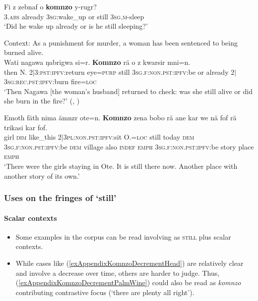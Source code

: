 \begin{exe}
	\ex\label{exAppendixKomnzo1}
	\gll Fi z zebnaf o \textbf{komnzo} y-rugr?\\
	3.\textsc{abs} already 3\textsc{sg}:wake\_up or still 3\textsc{sg.m}-sleep\\
	\glt \lq Did he wake up already or is he still sleeping?' \parencite[7]{Doehler2018}

	\ex\label{exAppendixKomnzo2}
	Context: As a punishment for murder, a woman has been sentenced to being burned alive. \\
	\gll Wati nagawa ŋabrigwa si=r. \textbf{Komnzo} rä o z kwarsir mni=n.\\
	then N. 2$|$3:\textsc{pst}:\textsc{ipfv}:return eye=\textsc{purp} still 3\textsc{sg}.\textsc{f}:\textsc{non}.\textsc{pst}:\textsc{ipfv}:be or already 2$|$3\textsc{sg}:\textsc{rec.pst}:\textsc{ipfv}:burn fire=\textsc{loc}\\
	\glt \lq Then Nagawa [the woman's husband] returned to check: was she still alive or did she burn in the fire?' (\cite[126]{Doehler2018}, \citeyear{Doehler2020})

	\ex\label{exAppendixKomnzo3} 
	\gll Emoth fäth nima ämnzr ote=n. \textbf{Komnzo} zena bobo rä ane kar we nä fof rä trikasi kar fof.\\
	girl \textsc{dim} like\_this 2|3\textsc{pl}:\textsc{non}.\textsc{pst}:\textsc{ipfv}:sit O.=\textsc{loc} still today \textsc{dem} 3\textsc{sg}.\textsc{f}:\textsc{non}.\textsc{pst}:\textsc{ipfv}:be \textsc{dem} village also \textsc{indef} \textsc{emph} 3\textsc{sg}.\textsc{f}:\textsc{non}.\textsc{pst}:\textsc{ipfv}:be story place \textsc{emph}\\
	\glt \lq There were the girls staying in Ote. It is still there now. Another place with another story of its own.' \parencite{Doehler2020}
\end{exe}

\subsubsection{Uses on the fringes of \lq{}still\rq{}}
\paragraph{Scalar contexts}\label{appendixKomnzoScalar}
\begin{itemize}
	\item Some examples in the corpus can be read involving as \textsc{still} plus scalar contexts.
	\item While cases like (\ref{exAppendixKomnzoDecrementHead}) are relatively clear and involve a decrease over time, others are harder to judge. Thus, (\ref{exAppendixKomnzoDecrementPalmWine}) could also be read as \textit{komnzo} contributing contrastive focus (\lq there are plenty all right\rq{}).
\end{itemize}

